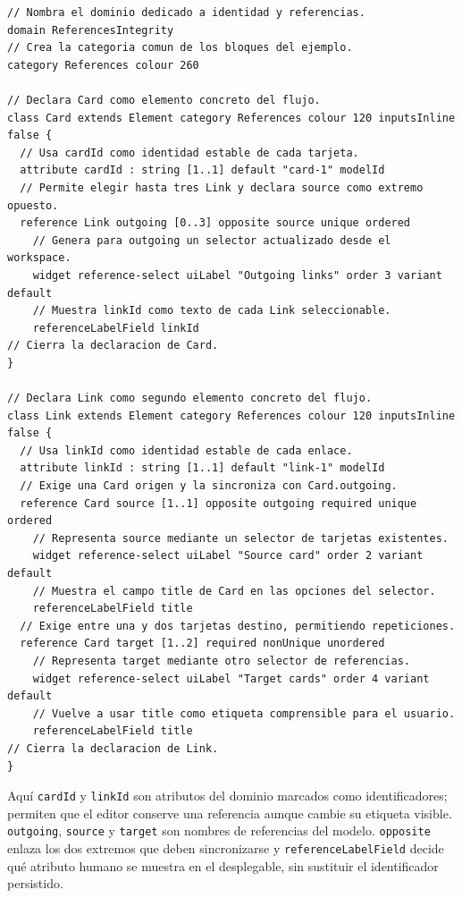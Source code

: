 \begin{lstlisting}[style=tfmm2b, captionpos=t, caption={Fragmento clave de \texttt{04\_references\_integrity} comentado línea a línea}, label={lst:references-integrity-dsl}]
// Nombra el dominio dedicado a identidad y referencias.
domain ReferencesIntegrity
// Crea la categoria comun de los bloques del ejemplo.
category References colour 260

// Declara Card como elemento concreto del flujo.
class Card extends Element category References colour 120 inputsInline false {
  // Usa cardId como identidad estable de cada tarjeta.
  attribute cardId : string [1..1] default "card-1" modelId
  // Permite elegir hasta tres Link y declara source como extremo opuesto.
  reference Link outgoing [0..3] opposite source unique ordered
    // Genera para outgoing un selector actualizado desde el workspace.
    widget reference-select uiLabel "Outgoing links" order 3 variant default
    // Muestra linkId como texto de cada Link seleccionable.
    referenceLabelField linkId
// Cierra la declaracion de Card.
}

// Declara Link como segundo elemento concreto del flujo.
class Link extends Element category References colour 120 inputsInline false {
  // Usa linkId como identidad estable de cada enlace.
  attribute linkId : string [1..1] default "link-1" modelId
  // Exige una Card origen y la sincroniza con Card.outgoing.
  reference Card source [1..1] opposite outgoing required unique ordered
    // Representa source mediante un selector de tarjetas existentes.
    widget reference-select uiLabel "Source card" order 2 variant default
    // Muestra el campo title de Card en las opciones del selector.
    referenceLabelField title
  // Exige entre una y dos tarjetas destino, permitiendo repeticiones.
  reference Card target [1..2] required nonUnique unordered
    // Representa target mediante otro selector de referencias.
    widget reference-select uiLabel "Target cards" order 4 variant default
    // Vuelve a usar title como etiqueta comprensible para el usuario.
    referenceLabelField title
// Cierra la declaracion de Link.
}
\end{lstlisting}

Aquí \texttt{cardId} y \texttt{linkId} son atributos del dominio marcados como
identificadores; permiten que el editor conserve una referencia aunque cambie
su etiqueta visible. \texttt{outgoing}, \texttt{source} y \texttt{target} son
nombres de referencias del modelo. \texttt{opposite} enlaza los dos extremos
que deben sincronizarse y \texttt{referenceLabelField} decide qué atributo
humano se muestra en el desplegable, sin sustituir el identificador persistido.

